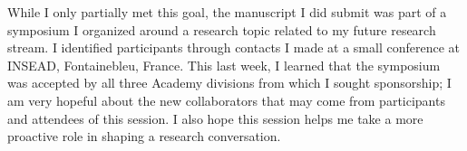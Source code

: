 \documentclass[11pt,article,oneside]{memoir}
\begin{document}
While I only partially met this goal, the manuscript I did submit was
part of a symposium I organized around a research topic related to my
future research stream. I identified participants through contacts I
made at a small conference at INSEAD, Fontainebleu, France. This last
week, I learned that the symposium was accepted by all three Academy
divisions from which I sought sponsorship; I am very hopeful about the
new collaborators that may come from participants and attendees of this
session. I also hope this session helps me take a more proactive role in
shaping a research conversation.

\hypertarget{refs}{}
\end{document}
